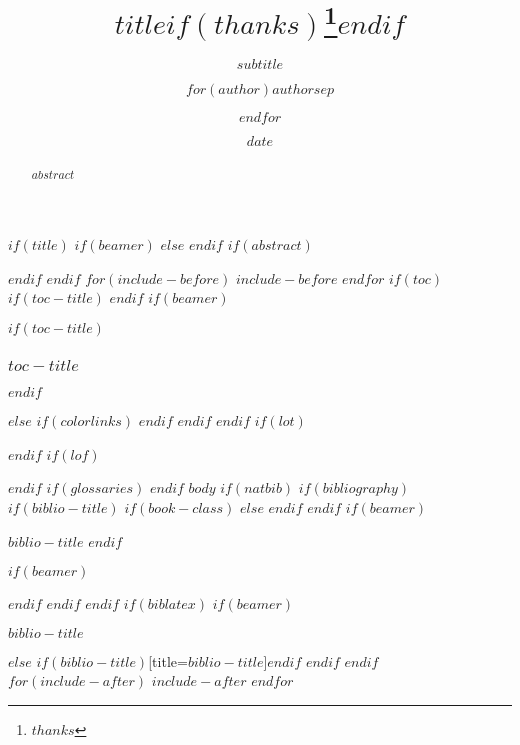 \documentclass[
$if(fontsize)$
  $fontsize$,
$endif$
$if(lang)$
  $babel-lang$,
$endif$
$if(papersize)$
  $papersize$paper,
$endif$
$if(beamer)$
  ignorenonframetext,
  $if(handout)$
    handout,
  $endif$
  $if(aspectratio)$
    aspectratio=$aspectratio$,
  $endif$
$endif$
$for(classoption)$
  $classoption$$sep$,
$endfor$
]{$documentclass$}
\title{$title$$if(thanks)$\thanks{$thanks$}$endif$}
\subtitle{$subtitle$}
\author{$for(author)$$author$$sep$ \and $endfor$}
\date{$date$}
\institute{$for(institute)$$institute$$sep$ \and $endfor$}
\newif\ifbibliography
\begin{document}
$if(title)$
  $if(beamer)$
    \frame{\titlepage}
  $else$
  $endif$
  $if(abstract)$
    \begin{abstract}
      $abstract$
    \end{abstract}
  $endif$
$endif$
$for(include-before)$
  $include-before$
$endfor$
$if(toc)$
  $if(toc-title)$
    \renewcommand*\contentsname{$toc-title$} 
  $endif$
  $if(beamer)$
    \begin{frame}
      $if(toc-title)$
        \frametitle{$toc-title$}
      $endif$
      \tableofcontents[hideallsubsections]
    \end{frame}
  $else$
    {
    $if(colorlinks)$
      \hypersetup{linkcolor=$if(toccolor)$$toccolor$$else$$endif$}
    $endif$
    \setcounter{tocdepth}{$toc-depth$}
    \tableofcontents
    }
  $endif$
$endif$
$if(lot)$
  \listoftables
$endif$
$if(lof)$
  \listoffigures
$endif$
$if(glossaries)$
  \printnoidxglossaries
$endif$
$body$
$if(natbib)$
  $if(bibliography)$
    $if(biblio-title)$
      $if(book-class)$
        \renewcommand\bibname{$biblio-title$}
      $else$
        \renewcommand\refname{$biblio-title$}
      $endif$
    $endif$
    $if(beamer)$
      \begin{frame}[allowframebreaks]{$biblio-title$}
        \bibliographytrue
    $endif$
    
    $if(beamer)$
      \end{frame}
    $endif$
  $endif$
$endif$
$if(biblatex)$
  $if(beamer)$
    \begin{frame}[allowframebreaks]{$biblio-title$}
      \bibliographytrue
      \printbibliography[heading=none]
    \end{frame}
  $else$
    \printbibliography$if(biblio-title)$[title=$biblio-title$]$endif$
  $endif$
$endif$
$for(include-after)$
  $include-after$
$endfor$
\end{document}
